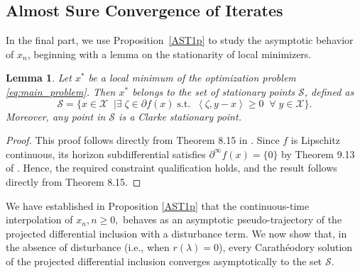 \documentclass[9pt,journal,twoside,web]{ieeecolor}
\newtheorem{lemma}{Lemma}
\newcommand{\inprod}[2]{\left\langle #1, #2 \right\rangle}
\begin{document}
\subsection{Almost Sure Convergence of Iterates }
\label{subsectionalmsot}
In the final part, we use Proposition~\ref{AST1p} to study the asymptotic behavior of ${x_n}$, beginning with a lemma on the stationarity of local minimizers.
\begin{lemma}
    Let $x^\ast$ be a local minimum of the optimization problem \eqref{eq:main_problem}. Then $x^\ast$ belongs to the set of stationary points $\mathcal{S}$, defined as
    \begin{equation*}
    \mathcal{S} = \{ x \in \mathcal{X} \; \; | \exists \;  \zeta \in \partial f(x) \; \text{s.t.} \; \; \inprod{\zeta}{y-x} \geq 0 \; \; \forall \; y \in \mathcal{X} \}. 
\end{equation*}
   Moreover, any point in $\mathcal{S}$ is a Clarke stationary point.
\end{lemma}

\begin{proof}
This proof follows directly from Theorem 8.15 in \cite{rockafellar1998variational}. Since $f$ is Lipschitz continuous, its horizon subdifferential satisfies $\partial^\infty f(x)=\{0\}$ by Theorem 9.13 of \cite{rockafellar1998variational}. Hence, the required constraint qualification holds, and the result follows directly from Theorem 8.15.
\end{proof}


We have established in Proposition \ref{AST1p} that the continuous-time interpolation of ${x_n,n\geq 0},$ behaves as an asymptotic pseudo-trajectory of the projected differential inclusion with a disturbance term. We now show that, in the absence of disturbance (i.e., when $r(\lambda) = 0$), every Carathéodory solution of the projected differential inclusion converges asymptotically to the set $\mathcal{S}$.
\end{document}
